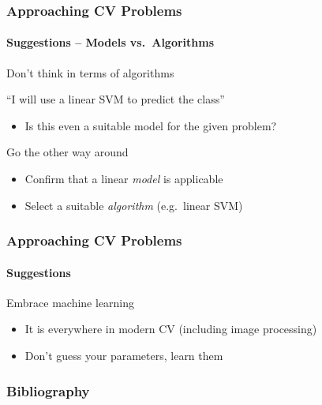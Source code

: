 \documentclass[xetex,professionalfont]{beamer}
\let\oldemph\emph
\renewcommand\emph[1]{\textcolor{tuwcvl_inf_red}{#1}}
\begin{document}
\begin{frame}
\frametitle{Approaching CV Problems}
\framesubtitle{Suggestions -- Models vs.\ Algorithms}

Don't think in terms of algorithms

\bigskip
\enquote{I will use a linear SVM to predict the class}
\begin{itemize}
    \item Is this even a suitable model for the given problem?
\end{itemize}

\bigskip
Go the other way around
\begin{itemize}
    \item Confirm that a linear \textit{model} is applicable
    \item Select a suitable \textit{algorithm} (e.g.\ linear SVM)
\end{itemize}

\end{frame}


\begin{frame}
\frametitle{Approaching CV Problems}
\framesubtitle{Suggestions}

Embrace machine learning
\begin{itemize}
    \item It is everywhere in modern CV (including image processing)
    \item Don't guess your parameters, learn them
\end{itemize}

\end{frame}


\renewcommand\emph[1]{\oldemph{#1}}

\begin{frame}
\frametitle{Bibliography}

\printbibliography

\end{frame}
\end{document}
